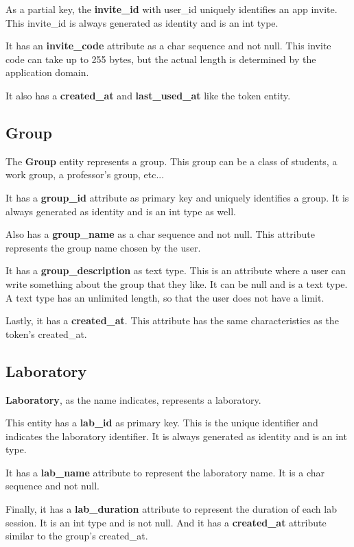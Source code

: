 \documentclass[a4paper,twoside,11pt]{article}
\begin{document}
As a partial key, the \textbf{invite\_id} with user\_id uniquely identifies an app invite. This invite\_id is always generated as identity and is an int type.

It has an \textbf{invite\_code} attribute as a char sequence and not null. This invite code can take up to 255 bytes, but the actual length is determined by the application domain.

It also has a \textbf{created\_at} and \textbf{last\_used\_at} like the token entity.

\subsection*{Group}
The \textbf{Group} entity represents a group. This group can be a class of students, a work group, a professor's group, etc...

It has a \textbf{group\_id} attribute as primary key and uniquely identifies a group. It is always generated as identity and is an int type as well.

Also has a \textbf{group\_name} as a char sequence and not null. This attribute represents the group name chosen by the user.

It has a \textbf{group\_description} as text type. This is an attribute where a user can write something about the group that they like. It can be null and is a text type.
A text type has an unlimited length, so that the user does not have a limit.

Lastly, it has a \textbf{created\_at}. This attribute has the same characteristics as the token's created\_at.

\subsection*{Laboratory}
\textbf{Laboratory}, as the name indicates, represents a laboratory. 

This entity has a \textbf{lab\_id} as primary key. This is the unique identifier and indicates the laboratory identifier. It is always generated as identity and is an int type.

It has a \textbf{lab\_name} attribute to represent the laboratory name. It is a char sequence and not null.

Finally, it has a \textbf{lab\_duration} attribute to represent the duration of each lab session. It is an int type and is not null. 
And it has a \textbf{created\_at} attribute similar to the group's created\_at.
\end{document}
